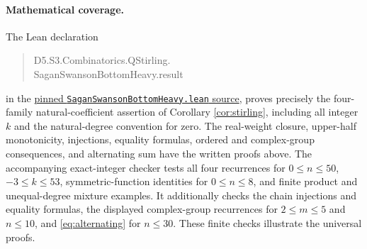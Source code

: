 \documentclass[11pt]{article}
\begin{document}
\paragraph{Mathematical coverage.}
The Lean declaration
\begin{quote}\small\ttfamily
D5.S3.Combinatorics.QStirling.\\
SaganSwansonBottomHeavy.result
\end{quote}
in the
\href{https://github.com/the-omega-institute/trureturing/blob/13f4288c2940bd2aa4020cec789956b9265769f5/D5/S3/Combinatorics/QStirling/SaganSwansonBottomHeavy.lean}{pinned \texttt{SaganSwansonBottomHeavy.lean} source},
proves precisely the four-family natural-coefficient assertion of
Corollary \ref{cor:stirling}, including all integer $k$ and the
natural-degree convention for zero. The real-weight closure,
upper-half monotonicity, injections, equality formulas, ordered and
complex-group consequences, and alternating sum have the written proofs above.
The accompanying exact-integer checker tests all four recurrences
for $0\le n\le50$, $-3\le k\le53$, symmetric-function identities
for $0\le n\le8$, and finite product and unequal-degree mixture
examples. It additionally checks the chain injections and equality
formulas, the displayed complex-group recurrences for $2\le m\le5$
and $n\le10$, and \eqref{eq:alternating} for $n\le30$.
These finite checks illustrate the universal proofs.
\end{document}
